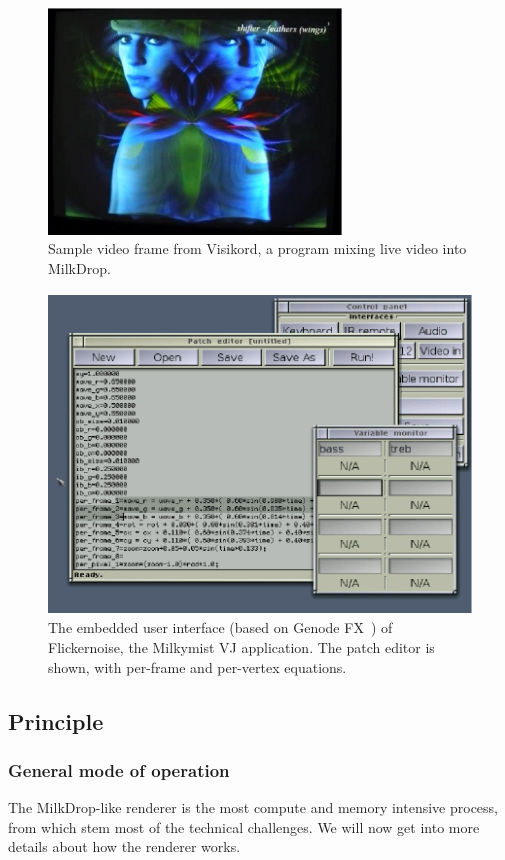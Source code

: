 \documentclass[a4paper,11pt]{kthesis}
\begin{document}
\begin{figure}[htp]
\centering
\includegraphics[height=60mm]{visikord.eps}
\caption{Sample video frame from Visikord, a program mixing live video into MilkDrop.}
\label{fig:visikord}
\end{figure}

\begin{figure}[htp]
\centering
\includegraphics[height=85mm]{flickernoise.eps}
\caption{The embedded user interface (based on Genode FX~\cite{genodefx}) of Flickernoise, the Milkymist VJ application. The patch editor is shown, with per-frame and per-vertex equations.}
\label{fig:flickernoise}
\end{figure}

\subsection{Principle}
\label{subsec:mdprinciple}
\subsubsection{General mode of operation}
The MilkDrop-like renderer is the most compute and memory intensive process, from which stem most of the technical challenges. We will now get into more details about how the renderer works.
\end{document}
